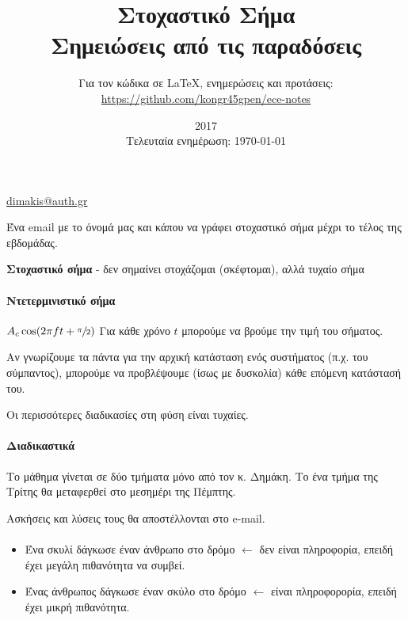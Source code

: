 \documentclass[11pt,a4paper,notitlepage,fleqn,final]{article}
\title{Στοχαστικό Σήμα
	\\
	{
	\normalsize Σημειώσεις από τις παραδόσεις
	}}
\date{2017
	\\
	{
	\small Τελευταία ενημέρωση: \today
	}
	}
\author{
	Για τον κώδικα σε \LaTeX, ενημερώσεις και προτάσεις:
\\
 \url{https://github.com/kongr45gpen/ece-notes}}
\begin{document}
	\maketitle

	\tableofcontents

	\vspace{50pt}

    \href{mailto:dimakis@auth.gr}{dimakis@auth.gr}
    
    Ένα email με το όνομά μας και κάπου να γράφει στοχαστικό
    σήμα μέχρι το τέλος της εβδομάδας.
    
    \textbf{Στοχαστικό σήμα} - δεν σημαίνει στοχάζομαι
    (σκέφτομαι), αλλά
    τυχαίο σήμα
    
    \paragraph{Ντετερμινιστικό σήμα}
    \( A_c\cos(2\pi f t + \sfrac{\pi}{2}) \)
    Για κάθε χρόνο \(t\) μπορούμε να βρούμε την τιμή του
    σήματος.
    
    Αν γνωρίζουμε τα πάντα για
    την αρχική κατάσταση ενός συστήματος
    (π.χ. του σύμπαντος), μπορούμε να προβλέψουμε
    (ίσως με δυσκολία) κάθε επόμενη κατάστασή του.
    
    Οι περισσότερες διαδικασίες στη φύση είναι τυχαίες.
    
    \paragraph{Διαδικαστικά}
    Το μάθημα γίνεται σε δύο τμήματα μόνο από τον κ. Δημάκη. Το
    ένα τμήμα της Τρίτης θα μεταφερθεί στο μεσημέρι της Πέμπτης.
    
    Ασκήσεις και λύσεις τους θα αποστέλλονται στο e-mail.
    
    \paragraph{}
    \begin{itemize}
    	\item Ένα σκυλί δάγκωσε έναν άνθρωπο στο δρόμο
    	\( \leftarrow \) δεν είναι πληροφορία, επειδή έχει
    	μεγάλη πιθανότητα να συμβεί.
    	\item Ένας άνθρωπος δάγκωσε έναν σκύλο στο δρόμο
    	\( \leftarrow \) είναι πληροφορορία, επειδή έχει μικρή
    	πιθανότητα.
    \end{itemize}
    
\end{document}
